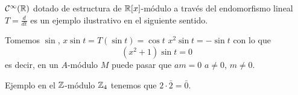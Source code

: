 \begin{obs}
  \(\mathcal{C}^\infty(\mathbb{R})\) dotado de estructura de \(\mathbb{R}[x]\)-módulo
  a través del endomorfismo lineal \(T=\frac{d}{dt}\) es un ejemplo
  ilustrativo en el siguiente sentido.

  Tomemos \(\sin\), \(x\sin t=T(\sin t)=\cos t\)
  \(x^2\sin t= -\sin t\) con lo que
  \[
    (x^2+1)\sin t=0
  \]
  es decir, en un \(A\)-módulo \(M\) puede pasar que \(a m=0\)
  \(a\neq 0\), \(m\neq 0\).
\end{obs}

Ejemplo en el \(\mathbb{Z}\)-módulo \(\mathbb{Z}_4\) tenemos que
\(2\cdot \bar{2}=\bar{0}\).
